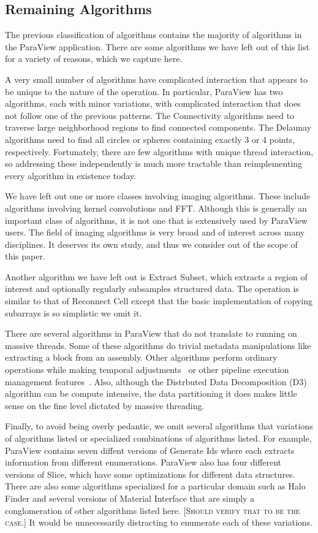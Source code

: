 \documentclass{sig-alternate}
\newcommand*{\lcite}[1]{~\cite{#1}}
\newcommand{\fix}[1]{{\color{red}\textsc{[#1]}}}
\newcommand{\algclass}[1]{\textsf{#1}}
\newcommand{\alg}[1]{#1}
\newcommand{\algorithmclasssection}[1]{\subsection*{#1}}
\begin{document}
\algorithmclasssection{Remaining Algorithms}

\noindent
The previous classification of algorithms contains the majority of
algorithms in the ParaView application. There are some algorithms we have
left out of this list for a variety of reasons, which we capture here.

A very small number of algorithms have complicated interaction that appears
to be unique to the nature of the operation. In particular, ParaView has
two algorithms, each with minor variations, with complicated interaction
that does not follow one of the previous patterns. The \alg{Connectivity}
algorithms need to traverse large neighborhood regions to find connected
components. The \alg{Delaunay} algorithms need to find all circles or
spheres containing exactly 3 or 4 points, respectively. Fortunately, there
are few algorithms with unique thread interaction, so addressing these
independently is much more tractable than reimplementing every algorithm in
existence today.

We have left out one or more classes involving imaging algorithms. These
include algorithms involving kernel convolutions and \alg{FFT}. Although
this is generally an important class of algorithms, it is not one that is
extensively used by ParaView users. The field of imaging algorithms is very
broad and of interest across many disciplines. It deserves its own study,
and thus we consider out of the scope of this paper.

Another algorithm we have left out is \alg{Extract Subset}, which extracts
a region of interest and optionally regularly subsamples structured
data. The operation is similar to that of \algclass{Reconnect Cell} except
that the basic implementation of copying subarrays is so simplistic we omit
it.

There are several algorithms in ParaView that do not translate to running
on massive threads. Some of these algorithms do trivial metadata
manipulations like extracting a block from an assembly. Other algorithms
perform ordinary operations while making temporal
adjustments\lcite{Biddiscombe2007} or other pipeline execution management
features\lcite{Moreland2013:TVCG}. Also, although the \alg{Distrbuted Data
  Decomposition} (\alg{D3}) algorithm can be compute intensive, the data
partitioning it does makes little sense on the fine level dictated by
massive threading.

Finally, to avoid being overly pedantic, we omit several algorithms that
variations of algorithms listed or specialized combinations of algorithms
listed. For example, ParaView contains seven diffent versions of
\alg{Generate Ids} where each extracts information from different
enumerations. ParaView also has four different versions of \alg{Slice},
which have some optimizations for different data structures. There are also
some algorithms specialized for a particular domain such as \alg{Halo
  Finder} and several versions of \alg{Material Interface} that are simply
a conglomeration of other algorithms listed here. \fix{Should verify that
  to be the case.} It would be unnecessarily
distracting to enumerate each of these variations.
\end{document}
